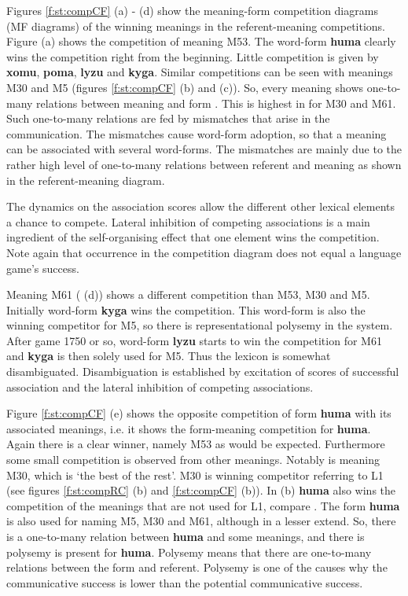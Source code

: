Figures \ref{f:st:compCF} (a) - (d) show the meaning-form competition diagrams (MF diagrams) of the winning meanings in the referent-meaning competitions. Figure (a) shows the competition of meaning M53. The word-form {\bf huma} clearly wins the competition right from the beginning. Little competition is given by {\bf xomu}, {\bf poma}, {\bf lyzu} and {\bf kyga}. Similar competitions can be seen with meanings M30 and M5 (figures \ref{f:st:compCF} (b) and (c)). So, every meaning shows one-to-many relations between meaning and form . This is highest in for M30 and M61. Such one-to-many relations are fed by mismatches that arise in the communication. The mismatches cause word-form adoption, so that a meaning can be associated with several word-forms. The mismatches are mainly due to the rather high level of one-to-many relations between referent and meaning as shown in the referent-meaning diagram. 

The dynamics on the association scores allow the different other lexical elements a chance to compete. Lateral inhibition of competing associations is a main ingredient of the self-organising effect that one element wins the competition. Note again that occurrence in the competition diagram does not equal a language game's success.



Meaning M61 ( (d)) shows a different competition than M53, M30 and M5. Initially word-form {\bf kyga} wins the competition. This word-form is also the winning competitor for M5, so there is representational polysemy in the system. After game 1750 or so, word-form {\bf lyzu} starts to win the competition for M61 and {\bf kyga} is then solely used for M5. Thus the lexicon is somewhat disambiguated. Disambiguation is established by excitation of scores of successful association and the lateral inhibition of competing associations.


Figure \ref{f:st:compCF} (e) shows the opposite competition of form {\bf huma} with its associated meanings, i.e. it shows the form-meaning competition for {\bf huma}. Again there is a clear winner, namely M53 as would be expected. Furthermore some small competition is observed from other meanings. Notably is meaning M30, which is `the best of the rest'. M30 is winning competitor referring to L1 (see figures \ref{f:st:compRC} (b) and \ref{f:st:compCF} (b)). In  (b) {\bf huma} also wins the competition of the meanings that are not used for L1, compare .  The form {\bf huma} is also used for naming M5, M30 and M61, although in a lesser extend. So, there is a one-to-many relation between {\bf huma} and some meanings, and there is polysemy is present for {\bf huma}. Polysemy means that there are one-to-many relations between the form and referent. Polysemy is one of the causes why the communicative success is lower than the potential communicative success.

